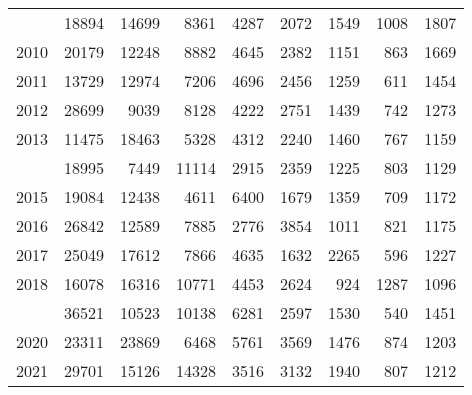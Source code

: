 \documentclass[
]{article}
\begin{document}
\begin{longtable}[t]{lrrrrrrrr}
\addlinespace
2009 & 18894 & 14699 & 8361 & 4287 & 2072 & 1549 & 1008 & 1807\\
2010 & 20179 & 12248 & 8882 & 4645 & 2382 & 1151 & 863 & 1669\\
2011 & 13729 & 12974 & 7206 & 4696 & 2456 & 1259 & 611 & 1454\\
2012 & 28699 & 9039 & 8128 & 4222 & 2751 & 1439 & 742 & 1273\\
2013 & 11475 & 18463 & 5328 & 4312 & 2240 & 1460 & 767 & 1159\\
\addlinespace
2014 & 18995 & 7449 & 11114 & 2915 & 2359 & 1225 & 803 & 1129\\
2015 & 19084 & 12438 & 4611 & 6400 & 1679 & 1359 & 709 & 1172\\
2016 & 26842 & 12589 & 7885 & 2776 & 3854 & 1011 & 821 & 1175\\
2017 & 25049 & 17612 & 7866 & 4635 & 1632 & 2265 & 596 & 1227\\
2018 & 16078 & 16316 & 10771 & 4453 & 2624 & 924 & 1287 & 1096\\
\addlinespace
2019 & 36521 & 10523 & 10138 & 6281 & 2597 & 1530 & 540 & 1451\\
2020 & 23311 & 23869 & 6468 & 5761 & 3569 & 1476 & 874 & 1203\\
2021 & 29701 & 15126 & 14328 & 3516 & 3132 & 1940 & 807 & 1212\\*
\end{longtable}
\end{document}
